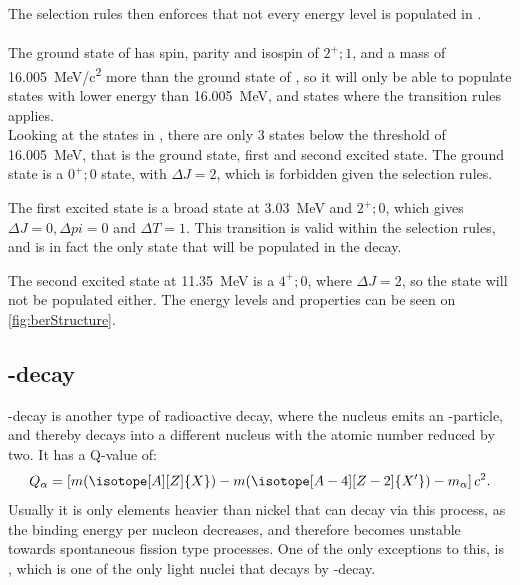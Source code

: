 The selection rules then enforces that not every energy level is populated in \ber. 
\\
\\
The ground state of \li has spin, parity and isospin of $2^+; 1$, and a mass of \SI{16.005}{MeV/c^2} more than the ground state of \ber, so it will only be able to populate states with lower energy than \SI{16.005}{MeV}, and states where the transition rules applies.\\
Looking at the states in \ber, there are only 3 states below the threshold of \SI{16.005}{MeV}, that is the ground state, first and second excited state. 
The ground state is a $0^+; 0$ state, with $\Delta J = 2$, which is forbidden given the selection rules. 

The first excited state is a broad state at \SI{3.03}{MeV} and $2^+; 0$, which gives $\Delta J = 0, \Delta pi = 0$ and $\Delta T = 1$. This transition is valid within the selection rules, and is in fact the only state that will be populated in the decay.

The second excited state at \SI{11.35}{MeV} is a  $4^+; 0$, where $\Delta J = 2$, so the state will not be populated either.
The energy levels and properties can be seen on \cref{fig:berStructure}.
\subsection{\al-decay}
\al-decay is another type of radioactive decay, where the nucleus emits an \al-particle, and thereby decays into a different nucleus with the atomic number reduced by two.  
It has a Q-value of:
\begin{equation}
Q_\alpha =  \left[ m (\isotope[A][Z]{X}) - m(\isotope[A-4][Z-2]{X'})  	- m_\alpha	 \right] c^2.
\end{equation}
Usually it is only elements heavier than nickel that can decay via this process, as the binding energy per nucleon decreases, and therefore becomes unstable towards spontaneous fission type processes. 
One of the only exceptions to this, is \ber, which is one of the only light nuclei that decays by \al-decay.


